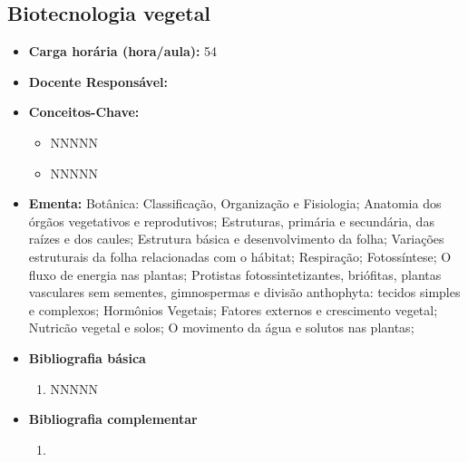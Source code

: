 \documentclass[11pt,fleqn]{book} %
\begin{document}
\subsection{Biotecnologia vegetal}\label{disc:biotecVegetal}
\begin{itemize}
	\item \textbf{Carga horária (hora/aula):} 54
	\item \textbf{Docente Responsável:}
	\item \textbf{Conceitos-Chave:}
	\begin{itemize}
		\item NNNNN
		\item NNNNN
	\end{itemize}
	\item \textbf{Ementa:} Botânica: Classificação, Organização e Fisiologia; 
	Anatomia dos órgãos vegetativos e reprodutivos;
	Estruturas, primária e secundária, das raízes e dos caules; 
	Estrutura básica e desenvolvimento da folha; 
	Variações estruturais da folha relacionadas com o hábitat;
	Respiração; 
	Fotossíntese;
	O fluxo de energia nas plantas; 
	Protistas fotossintetizantes, briófitas, plantas vasculares sem sementes, gimnospermas e divisão anthophyta: tecidos simples e complexos; 
	Hormônios Vegetais; 
	Fatores externos e crescimento vegetal; 
	Nutricão vegetal e solos; 
	O movimento da água e solutos nas plantas; 
	\item \textbf{Bibliografia básica}
	\begin{enumerate}
		\item NNNNN
	\end{enumerate}
	\item \textbf{Bibliografia complementar}
	\begin{enumerate}
		\item 
	\end{enumerate}	
\end{itemize}


\newpage
\end{document}
